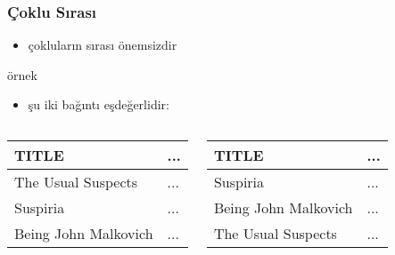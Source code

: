 \documentclass[dvipsnames]{beamer}
\theoremstyle{plain}
\begin{document}
\begin{frame}
  \frametitle{Çoklu Sırası}

  \begin{itemize}
    \item çokluların sırası önemsizdir
  \end{itemize}

  \medskip
  \begin{exampleblock}{örnek}
    \begin{itemize}
      \item şu iki bağıntı eşdeğerlidir:
    \end{itemize}

    \begin{columns}
      \begin{footnotesize}
      \begin{table}
        \begin{tabular}{|l|l|}\hline
TITLE                & ...\\\hline\hline
The Usual Suspects   & ...\\\hline
Suspiria             & ...\\\hline
Being John Malkovich & ...\\\hline
        \end{tabular}
      \end{table}
      \end{footnotesize}

      \begin{footnotesize}
      \begin{table}
        \begin{tabular}{|l|l|}\hline
TITLE                & ...\\\hline\hline
Suspiria             & ...\\\hline
Being John Malkovich & ...\\\hline
The Usual Suspects   & ...\\\hline
        \end{tabular}
      \end{table}
      \end{footnotesize}
    \end{columns}
  \end{exampleblock}
\end{frame}
\end{document}
